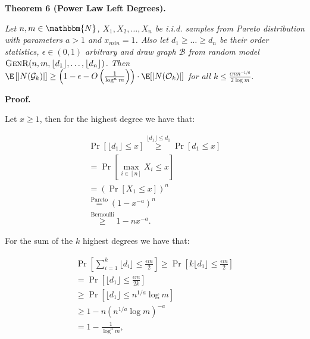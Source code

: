 

\par\medskip\noindent\textbf{\textbf{Theorem 6}\textbf{ }(Power Law Left Degrees)\textbf{.}}\par



\emph{Let $n,m\in\mathbbm{N}$, $X_{1},X_{2},\dots,X_{n}$ be i.i.d. samples from Pareto distribution with parameters $a>1$ and $x_{min}=1$.
Also let $d_{1}\geq\dots\geq d_{n}$ be their order statistics, $\epsilon\in(0,1)$ arbitrary and draw graph $\mathcal{B}$ from random model $\textsc{GenR}(n,m,\lfloor d_{1}\rfloor,\dots,\lfloor d_{n}\rfloor)$.
Then $\E\left[|N(\mathcal{G}_{k})|\right]\geq\left(1-\epsilon-O\left(\frac{1}{\log^{a}{m}}\right)\right)\cdot\E[|N(\mathcal{O}_{k})|]$
for all $k\leq\frac{\epsilon mn^{-1/a}}{2\log{m}}$.}\par






\par\medskip\noindent\textbf{Proof.}\par



Let $x\geq 1$, then for the highest degree we have that:\par


\[\begin{gathered}
\displaystyle\Pr\left[\lfloor d_{1}\rfloor\leq x\right] \displaystyle\overset{\lfloor d_{1}\rfloor\leq d_{1}}{\geq}\Pr\left[d_{1}\leq x\right] \\
\displaystyle=\Pr\left[\max_{i\in[n]}X_{i}\leq x\right] \\
\displaystyle=\left(\Pr\left[X_{1}\leq x\right]\right)^{n} \\
\displaystyle\overset{\text{Pareto}}{=}\left(1-x^{-a}\right)^{n} \\
\displaystyle\overset{\text{Bernoulli}}{\geq}1-nx^{-a}.
\end{gathered}\]


For the sum of the $k$ highest degrees we have that:\par


\[\begin{gathered}
\displaystyle\Pr\left[\sum_{i=1}^{k}\lfloor d_{i}\rfloor\leq\frac{\epsilon m}{2}\right] \displaystyle\geq\Pr\left[k\lfloor d_{1}\rfloor\leq\frac{\epsilon m}{2}\right] \\
\displaystyle=\Pr\left[\lfloor d_{1}\rfloor\leq\frac{\epsilon m}{2k}\right] \\
\displaystyle\geq\Pr\left[\lfloor d_{1}\rfloor\leq n^{1/a}\log{m}\right] \\
\displaystyle\geq 1-n\left(n^{1/a}\log{m}\right)^{-a} \\
\displaystyle=1-\frac{1}{\log^{a}{m}},
\end{gathered}\]


